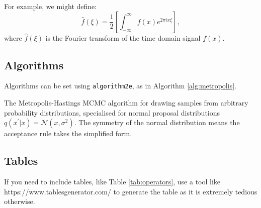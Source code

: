 \documentclass{l4proj}
\begin{document}
For example, we might define:
\begin{equation}
    \hat{f}(\xi) = \frac{1}{2}\left[ \int_{-\infty}^{\infty} f(x) e^{2\pi i x \xi} \right],
\end{equation}    
where $\hat{f}(\xi)$ is the Fourier transform of the time domain signal $f(x)$.

\subsection{Algorithms}
Algorithms can be set using \texttt{algorithm2e}, as in Algorithm \ref{alg:metropolis}.

\begin{algorithm}
    \DontPrintSemicolon
    
\caption{The Metropolis-Hastings MCMC algorithm for drawing samples from arbitrary probability distributions, 
specialised for normal proposal distributions $q(x^\prime|x) = \mathcal{N}(x, \sigma^2)$. The symmetry of the normal distribution means the acceptance rule takes the simplified form.}\label{alg:metropolis}
\end{algorithm}

\subsection{Tables}

If you need to include tables, like Table \ref{tab:operators}, use a tool like https://www.tablesgenerator.com/ to generate the table as it is
extremely tedious otherwise. 
\end{document}
